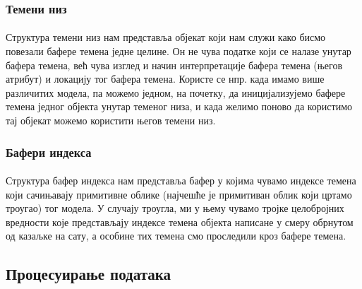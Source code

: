 \documentclass[12pt]{article}
\begin{document}
	\subsubsection{Темени низ}
	\paragraph{}
	Структура темени низ нам представља објекат који нам служи како бисмо повезали бафере темена једне целине. Он не чува податке који се налазе унутар бафера темена, већ чува изглед и начин интерпретације бафера темена (његов атрибут) и локацију тог бафера темена. Користе се нпр. када имамо више различитих модела, па можемо једном, на почетку, да иницијализујемо бафере темена једног објекта унутар теменог низа, и када желимо поново да користимо тај објекат можемо користити његов темени низ.
	
	\subsubsection{Бафери индекса}
	\paragraph{}
	Структура бафер индекса нам представља бафер у којима чувамо индексе темена који сачињавају примитивне облике (најчешће је примитиван облик који цртамо троугао) тог модела. У случају троугла, ми у њему чувамо тројке целобројних вредности које представљају индексе темена објекта написане у смеру обрнутом од казаљке на сату, а особине тих темена смо проследили кроз бафере темена.
	
	\subsection{Процесуирање података}
\end{document}
